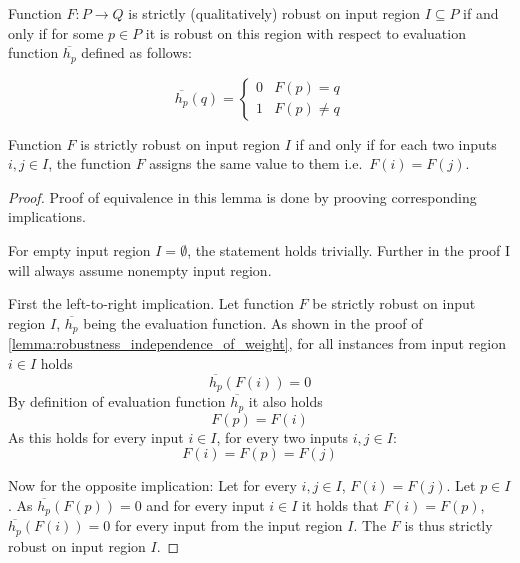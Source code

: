 \begin{definition}%
    \label{def:strict_robustness}
    Function $F: P\to Q$ is strictly (qualitatively) robust on input region $I\subseteq P$
    if and only if for some $p\in P$ it is robust on this region with respect
    to evaluation function $\overline{h_p}$ defined as follows:

    \begin{equation*}
        \overline{h_p}(q) = \left\{\begin{matrix}
            0 & F(p) = q\\
            1 & F(p) \neq q
        \end{matrix}\right.
    \end{equation*}
\end{definition}

\begin{lemma}{Function $F$ is strictly robust on input region $I$
    if and only if for each two inputs $i, j\in I$, the function $F$ assigns the same value to them
    i.e.\ $F(i)=F(j)$.}
    \begin{proof}
        Proof of equivalence in this lemma is done
        by prooving corresponding implications.

        For empty input region $I=\emptyset$, the statement holds trivially.
        Further in the proof I will always assume nonempty input region.

        First the left-to-right implication.
        Let function $F$ be strictly robust on input region $I$,
        $\overline{h_p}$ being the evaluation function.
        As shown in the proof of \cref{lemma:robustness_independence_of_weight},
        for all instances from input region $i\in I$ holds
        \begin{equation*}
            \overline{h_p}(F(i)) = 0
        \end{equation*}
        By definition of evaluation function $\overline{h_p}$ it also holds
        \begin{equation*}
            F(p) = F(i)
        \end{equation*}
        As this holds for every input $i\in I$, for every two inputs $i, j\in I$:
        \begin{equation*}
            F(i) = F(p) = F(j)
        \end{equation*}

        Now for the opposite implication: Let for every $i, j\in I$, $F(i) = F(j)$.
        Let $p\in I$. As $\overline{h_p}(F(p)) = 0$
        and for every input $i\in I$ it holds that $F(i) = F(p)$,
        $\overline{h_p}(F(i)) = 0$ for every input from the input region $I$.
        The $F$ is thus strictly robust on input region $I$.
    \end{proof}
\end{lemma}

